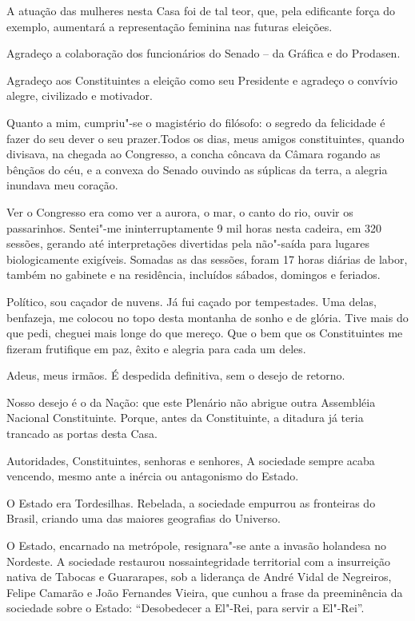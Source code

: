 A atuação das mulheres nesta Casa foi de tal teor, que, pela edificante
força do exemplo, aumentará a representação feminina nas futuras
eleições.

Agradeço a colaboração dos funcionários do Senado -- da Gráfica e do
Prodasen.

Agradeço aos Constituintes a eleição como seu Presidente e agradeço o
convívio alegre, civilizado e motivador.

Quanto a mim, cumpriu"-se o magistério do filósofo: o segredo da
felicidade é fazer do seu dever o seu prazer.Todos os dias, meus amigos
constituintes, quando divisava, na chegada ao Congresso, a concha
côncava da Câmara rogando as bênçãos do céu, e a convexa do Senado
ouvindo as súplicas da terra, a alegria inundava meu coração.

Ver o Congresso era como ver a aurora, o mar, o canto do rio, ouvir os
passarinhos. Sentei"-me ininterruptamente 9 mil horas nesta cadeira, em
320 sessões, gerando até interpretações divertidas pela não"-saída para
lugares biologicamente exigíveis. Somadas as das sessões, foram 17 horas
diárias de labor, também no gabinete e na residência, incluídos sábados,
domingos e feriados.

Político, sou caçador de nuvens. Já fui caçado por tempestades. Uma
delas, benfazeja, me colocou no topo desta montanha de sonho e de
glória. Tive mais do que pedi, cheguei mais longe do que mereço. Que o
bem que os Constituintes me fizeram frutifique em paz, êxito e alegria
para cada um deles.

Adeus, meus irmãos. É despedida definitiva, sem o desejo de retorno.

Nosso desejo é o da Nação: que este Plenário não abrigue outra
Assembléia Nacional Constituinte. Porque, antes da Constituinte, a
ditadura já teria trancado as portas desta Casa.

Autoridades, Constituintes, senhoras e senhores, A sociedade sempre
acaba vencendo, mesmo ante a inércia ou antagonismo do Estado.

O Estado era Tordesilhas. Rebelada, a sociedade empurrou as fronteiras
do Brasil, criando uma das maiores geografias do Universo.

O Estado, encarnado na metrópole, resignara"-se ante a invasão holandesa
no Nordeste. A sociedade restaurou nossaintegridade territorial com a
insurreição nativa de Tabocas e Guararapes, sob a liderança de André
Vidal de Negreiros, Felipe Camarão e João Fernandes Vieira, que cunhou a
frase da preeminência da sociedade sobre o Estado: ``Desobedecer a
El"-Rei, para servir a El"-Rei''.

